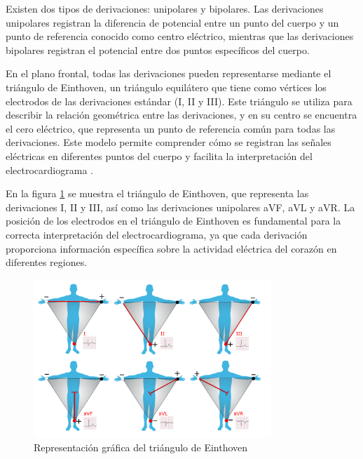         Existen dos tipos de derivaciones: unipolares y bipolares. Las derivaciones unipolares registran la diferencia de potencial entre un punto del cuerpo y un punto de referencia conocido como centro eléctrico, mientras que las derivaciones bipolares registran el potencial entre dos puntos específicos del cuerpo.

        En el plano frontal, todas las derivaciones pueden representarse mediante el triángulo de Einthoven, un triángulo equilátero que tiene como vértices los electrodos de las derivaciones estándar (I, II y III). Este triángulo se utiliza para describir la relación geométrica entre las derivaciones, y en su centro se encuentra el cero eléctrico, que representa un punto de referencia común para todas las derivaciones. Este modelo permite comprender cómo se registran las señales eléctricas en diferentes puntos del cuerpo y facilita la interpretación del electrocardiograma \cite{mauricio_2008}.

        En la figura \ref{fig:triangulo_Einthoven} se muestra el triángulo de Einthoven, que representa las derivaciones I, II y III, así como las derivaciones unipolares aVF, aVL y aVR. La posición de los electrodos en el triángulo de Einthoven es fundamental para la correcta interpretación del electrocardiograma, ya que cada derivación proporciona información específica sobre la actividad eléctrica del corazón en diferentes regiones.

        \begin{figure}[H]
            \centering
            \includegraphics[width=0.8\textwidth]{img/Marco/triangulo.png}
            \caption[Representación gráfica del triángulo de Einthoven]{Representación gráfica del triángulo de Einthoven\footnotemark}
            \label{fig:triangulo_Einthoven}
        \end{figure}

